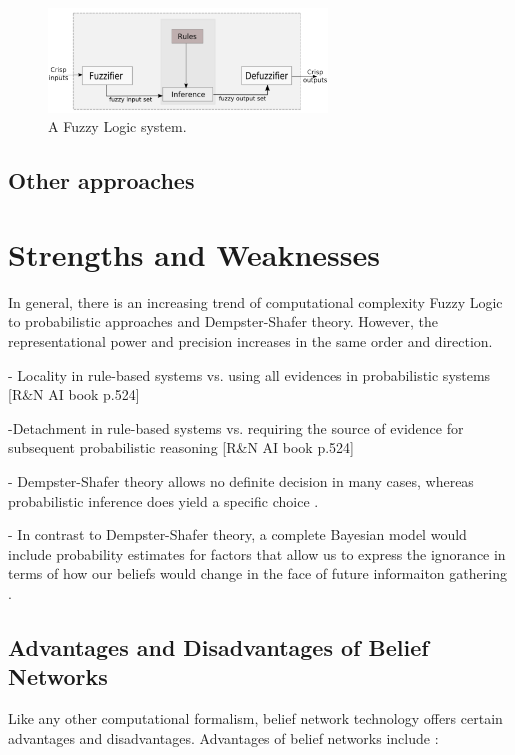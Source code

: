 \documentclass[11pt]{article}
\begin{document}
\begin{figure}[tbh]
  \center
  \includegraphics[width=0.66\textwidth]{figure/fuzzy-system.png}
  \caption{A Fuzzy Logic system.}
  \label{fig:fuzzy-system}
\end{figure}

\subsection{Other approaches}

\section{Strengths and Weaknesses}

In general, there is an increasing trend of computational complexity Fuzzy Logic
to probabilistic approaches and Dempster-Shafer theory. However, the
representational power and precision increases in the same order and direction.

- Locality in rule-based systems vs. using all evidences in probabilistic
systems [R\&N AI book p.524]

-Detachment in rule-based systems vs. requiring the source of evidence for
subsequent probabilistic reasoning [R\&N AI book p.524]

- Dempster-Shafer theory allows no definite decision in many cases, whereas
probabilistic inference does yield a specific choice \cite{russell:ai-modern}.

- In contrast to Dempster-Shafer theory, a complete Bayesian model would include
probability estimates for factors that allow us to express the ignorance in
terms of how our beliefs would change in the face of future informaiton
gathering \cite{russell:ai-modern}.

\subsection{Advantages and Disadvantages of Belief Networks}

Like any other computational formalism, belief network technology offers certain
advantages and disadvantages. Advantages of belief networks include
\cite{das:decision-making-agents}:
\end{document}
